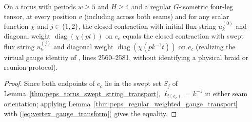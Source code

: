 \begin{lemma}
    \label{thm:peps_torus_charge_string_deformation}
    \leanok
    On a torus with periods $w\ge 5$ and $H\ge 4$ and a regular $G$-isometric four-leg tensor, at every position $v$ (including across both seams) and for any scalar function $\chi$ and $j\in\{1,2\}$, the closed contraction with initial flux string $u^{(0)}_k$ and diagonal weight $\operatorname{diag}(\chi(pt))$ on $e_c$ equals the closed contraction with swept flux string $u^{(j)}_k$ and diagonal weight $\operatorname{diag}(\chi(pk^{-1}t))$ on $e_c$ (realizing the virtual gauge identity of \cite{Schuch2010PEPS}, lines 2560--2581, without identifying a physical braid or reunion protocol).
\end{lemma}
\begin{proof}\leanok
    Since both endpoints of $e_c$ lie in the swept set $S_j$ of Lemma~\ref{thm:peps_torus_swept_string_transport}, $\ell_{t(e_c)}=k^{-1}$ in either seam orientation; applying Lemma~\ref{thm:peps_regular_weighted_gauge_transport} with (\ref{eq:vertex_gauge_transform}) gives the equality.
\end{proof}
